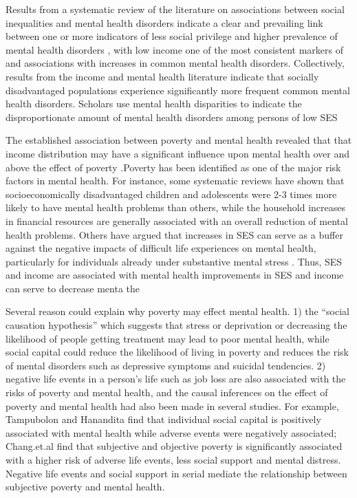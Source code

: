 \documentclass{article}
\begin{document}
Results from a systematic review of the literature on associations between social inequalities and mental health disorders indicate a clear and prevailing link between  one or more indicators of less social privilege and higher prevalence of mental health disorders \citep{Fryers2003}, with low income one of the most consistent markers of and associations with increases in common mental health disorders. Collectively, results from the income and mental health literature indicate that socially disadvantaged populations experience significantly more frequent common mental health disorders. Scholars use mental health disparities to indicate the disproportionate amount of mental health disorders among persons of low SES \citep{RN1292}

The established association between poverty and mental health revealed that that income distribution may have a significant influence upon mental health over and above the effect of poverty \citep{HANANDITA201459}.Poverty has been identified as one of the major risk factors in mental health. For instance, some systematic reviews have shown that socioeconomically disadvantaged children and adolescents were 2-3 times more likely to have mental health problems than others\citep{REISS201324}, while the household increases in financial resources are generally associated with an overall reduction of mental health problems\citep{2015Does}. Others have argued that increases in SES can serve as a buffer against the negative impacts of difficult life experiences on mental health, particularly for individuals already under substantive mental stress \citep{Kawachi2001Sep}. Thus, SES and income are associated with mental health improvements in SES and income can serve to decrease menta the 

 
Several reason could explain why poverty may effect mental health. 1) the “social causation hypothesis” which suggests that stress or deprivation or decreasing the likelihood of people getting treatment may lead to poor mental health\citep{mills2015}, while social capital could reduce the likelihood of living in poverty and reduces the risk of mental disorders such as depressive symptoms and suicidal tendencies\citep{RN1291}. 2) negative life events in a person’s life such as job loss are also associated with the risks of poverty\citep{RN1293} and mental health\citep{TAMPUBOLON201420}, and the causal inferences on the effect of poverty and mental health had also been made in several studies. For example, Tampubolon and Hanandita\citep{TAMPUBOLON201420} find that individual social capital is positively associated with mental health while adverse events were negatively associated; Chang.et.al \citep{RN1291} find that subjective and objective poverty is significantly associated with a higher risk of adverse life events, less social support and mental distress. Negative life events and social support in serial mediate the relationship between subjective poverty and mental health.
\end{document}
